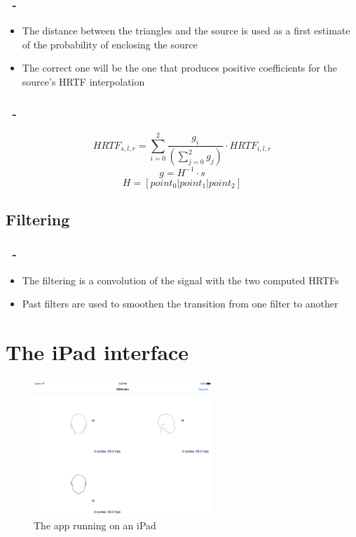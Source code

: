 \documentclass{beamer}
\begin{document}
	\begin{frame}
		\frametitle{\insertsection\ - \insertsubsection}
		\begin{itemize}
			\item The distance between the triangles and the source is used as a first estimate of the probability of enclosing
				the source
			\item The correct one will be the one that produces positive coefficients for the source's HRTF interpolation
		\end{itemize}
	\end{frame}

	\begin{frame}
		\frametitle{\insertsection\ - \insertsubsection}
		$$ HRTF_{s,l,r} = \sum\limits_{i=0}^2 \dfrac{ g_i } { \left( \sum\limits_{j=0}^2 g_j \right) } \cdot HRTF_{i,l,r} $$
		$$ g = H^{-1} \cdot s $$
		$$ H = [ point_0 | point_1 | point_2 ] $$
	\end{frame}
	
	\subsection{Filtering}

	\begin{frame}
		\frametitle{\insertsection\ - \insertsubsection}
		\begin{itemize}
			\item The filtering is a convolution of the signal with the two computed HRTFs
			\item Past filters are used to smoothen the transition from one filter to another
		\end{itemize}
	\end{frame}

	\section{The iPad interface}

	\begin{frame}
		\frametitle{\insertsection}
		\begin{figure}
			\centering
			\includegraphics[width=0.6\textwidth]{images/iOS_screenshot_0.png}
			\caption{The app running on an iPad}
			\label{fig:ios_app}
		\end{figure}
	\end{frame}
\end{document}
